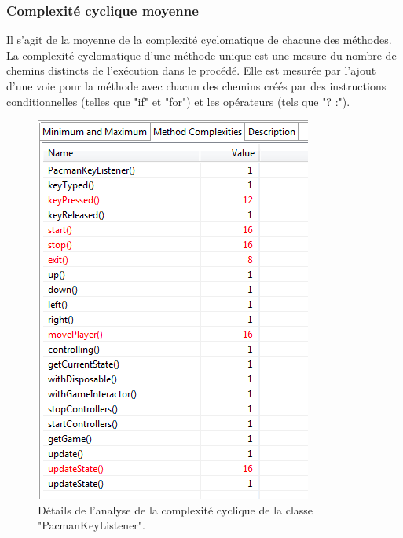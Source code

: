 \documentclass[12pt,a4paper,final]{article}
\begin{document}
\subsubsection{Complexité cyclique moyenne}
Il s'agit de la moyenne de la complexité cyclomatique de chacune des méthodes. La complexité cyclomatique d'une méthode unique est une mesure du nombre de chemins distincts de l'exécution dans le procédé. Elle est mesurée par l'ajout d'une voie pour la méthode avec chacun des chemins créés par des instructions conditionnelles (telles que "if" et "for") et les opérateurs (tels que "? :").
\begin{figure}[!h]
	\centering
	\includegraphics[width=\textwidth]{ACC_PacmanKeyListener.png}
	\caption{\label{ACC1}Détails de l'analyse de la complexité cyclique de la classe "PacmanKeyListener".}
\end{figure}
\end{document}
